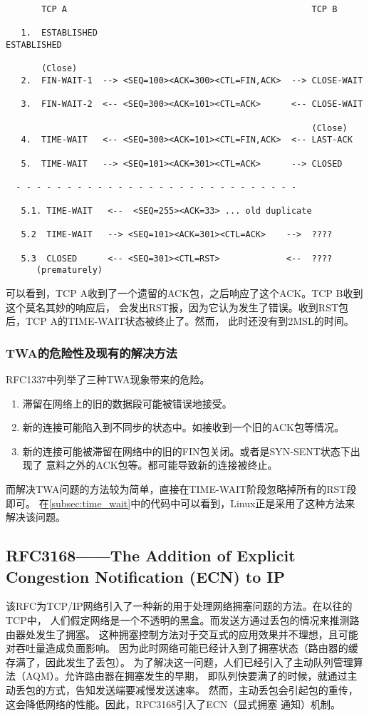 \begin{verbatim}
       TCP A                                                TCP B

   1.  ESTABLISHED                                          ESTABLISHED

       (Close)
   2.  FIN-WAIT-1  --> <SEQ=100><ACK=300><CTL=FIN,ACK>  --> CLOSE-WAIT

   3.  FIN-WAIT-2  <-- <SEQ=300><ACK=101><CTL=ACK>      <-- CLOSE-WAIT

                                                            (Close)
   4.  TIME-WAIT   <-- <SEQ=300><ACK=101><CTL=FIN,ACK>  <-- LAST-ACK

   5.  TIME-WAIT   --> <SEQ=101><ACK=301><CTL=ACK>      --> CLOSED

  - - - - - - - - - - - - - - - - - - - - - - - - - - - -

   5.1. TIME-WAIT   <--  <SEQ=255><ACK=33> ... old duplicate

   5.2  TIME-WAIT   --> <SEQ=101><ACK=301><CTL=ACK>    -->  ????

   5.3  CLOSED      <-- <SEQ=301><CTL=RST>             <--  ????
      (prematurely)
\end{verbatim}
可以看到，TCP A收到了一个遗留的ACK包，之后响应了这个ACK。TCP B收到这个莫名其妙的响应后，
会发出RST报，因为它认为发生了错误。收到RST包后，TCP A的TIME-WAIT状态被终止了。然而，
此时还没有到2MSL的时间。

\subsubsection{TWA的危险性及现有的解决方法}
RFC1337中列举了三种TWA现象带来的危险。

\begin{enumerate}
\item 滞留在网络上的旧的数据段可能被错误地接受。
\item 新的连接可能陷入到不同步的状态中。如接收到一个旧的ACK包等情况。
\item 新的连接可能被滞留在网络中的旧的FIN包关闭。或者是SYN-SENT状态下出现了
意料之外的ACK包等。都可能导致新的连接被终止。
\end{enumerate}

而解决TWA问题的方法较为简单，直接在TIME-WAIT阶段忽略掉所有的RST段即可。
在\ref{subsec:time_wait}中的代码中可以看到，Linux正是采用了这种方法来解决该问题。

\subsection{RFC3168——The Addition of Explicit Congestion Notification (ECN) to IP}
\label{subsec:rfc3168}
该RFC为TCP/IP网络引入了一种新的用于处理网络拥塞问题的方法。在以往的TCP中，
人们假定网络是一个不透明的黑盒。而发送方通过丢包的情况来推测路由器处发生了拥塞。
这种拥塞控制方法对于交互式的应用效果并不理想，且可能对吞吐量造成负面影响。
因为此时网络可能已经计入到了拥塞状态（路由器的缓存满了，因此发生了丢包）。
为了解决这一问题，人们已经引入了主动队列管理算法（AQM）。允许路由器在拥塞发生的早期，
即队列快要满了的时候，就通过主动丢包的方式，告知发送端要减慢发送速率。
然而，主动丢包会引起包的重传，这会降低网络的性能。因此，RFC3168引入了ECN（显式拥塞
通知）机制。

